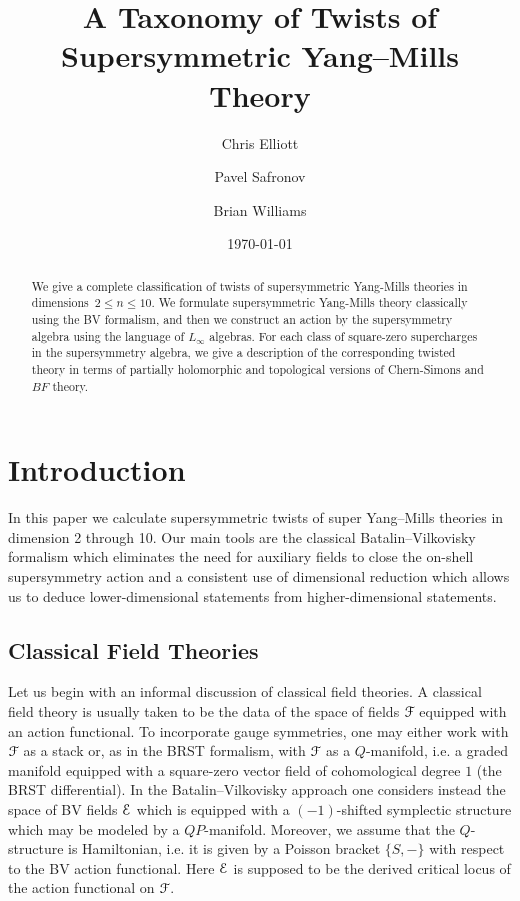 \documentclass[10pt, oneside]{article}
\title{A Taxonomy of Twists of Supersymmetric Yang--Mills Theory}
\author{Chris Elliott\and Pavel Safronov \and Brian Williams}
\date{\today}
\begin{document}
\maketitle

\begin{abstract}
We give a complete classification of twists of supersymmetric Yang-Mills theories in dimensions~$2\leq n \leq 10$.
We formulate supersymmetric Yang-Mills theory classically using the BV formalism, and then we construct an action by the supersymmetry algebra using the language of $L_\infty$ algebras.
For each class of square-zero supercharges in the supersymmetry algebra, we give a description of the corresponding twisted theory in terms of partially holomorphic and topological versions of Chern-Simons and $BF$ theory. 
\end{abstract}

\setcounter{tocdepth}{2}
\tableofcontents

\section*{Introduction} 
\label{sect:intro}

In this paper we calculate supersymmetric twists of super Yang--Mills theories in dimension 2 through 10. Our main tools are the classical Batalin--Vilkovisky formalism which eliminates the need for auxiliary fields to close the on-shell supersymmetry action and a consistent use of dimensional reduction which allows us to deduce lower-dimensional statements from higher-dimensional statements.

\subsection*{Classical Field Theories}

Let us begin with an informal discussion of classical field theories. A classical field theory is usually taken to be the data of the space of fields $\mathcal F$ equipped with an action functional. To incorporate gauge symmetries, one may either work with $\mathcal F$ as a stack or, as in the BRST formalism, with $\mathcal F$ as a $Q$-manifold, i.e. a graded manifold equipped with a square-zero vector field of cohomological degree $1$ (the BRST differential). In the Batalin--Vilkovisky approach one considers instead the space of BV fields $\mathcal E$ which is equipped with a $(-1)$-shifted symplectic structure which may be modeled by a $QP$-manifold. Moreover, we assume that the $Q$-structure is Hamiltonian, i.e. it is given by a Poisson bracket $\{S, -\}$ with respect to the BV action functional. Here $\mathcal E$ is supposed to be the derived critical locus of the action functional on $\mathcal F$.
\end{document}
